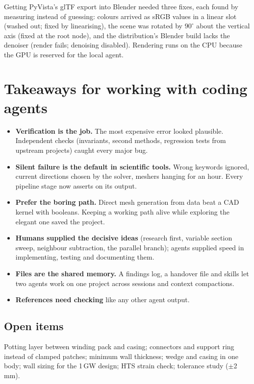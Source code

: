 \documentclass[10pt,a4paper]{article}
\begin{document}
Getting PyVista's glTF export into Blender needed three fixes, each found by measuring instead of guessing:
colours arrived as sRGB values in a linear slot (washed out; fixed by linearising), the scene was rotated by
$90^\circ$ about the vertical axis (fixed at the root node), and the distribution's Blender build lacks the
denoiser (render fails; denoising disabled). Rendering runs on the CPU because the GPU is reserved for the local
agent.

\section{Takeaways for working with coding agents}
\begin{itemize}\itemsep1pt
\item \textbf{Verification is the job.} The most expensive error looked plausible. Independent checks
  (invariants, second methods, regression tests from upstream projects) caught every major bug.
\item \textbf{Silent failure is the default in scientific tools.} Wrong keywords ignored, current directions
  chosen by the solver, meshers hanging for an hour. Every pipeline stage now asserts on its output.
\item \textbf{Prefer the boring path.} Direct mesh generation from data beat a CAD kernel with booleans. Keeping a
  working path alive while exploring the elegant one saved the project.
\item \textbf{Humans supplied the decisive ideas} (research first, variable section sweep, neighbour subtraction,
  the parallel branch); agents supplied speed in implementing, testing and documenting them.
\item \textbf{Files are the shared memory.} A findings log, a handover file and skills let two agents work on one
  project across sessions and context compactions.
\item \textbf{References need checking} like any other agent output.
\end{itemize}

\subsection*{Open items}
Potting layer between winding pack and casing; connectors and support ring instead of clamped patches; minimum
wall thickness; wedge and casing in one body; wall sizing for the 1\,GW design; HTS strain check; tolerance study
($\pm$2\,mm).
\end{document}
